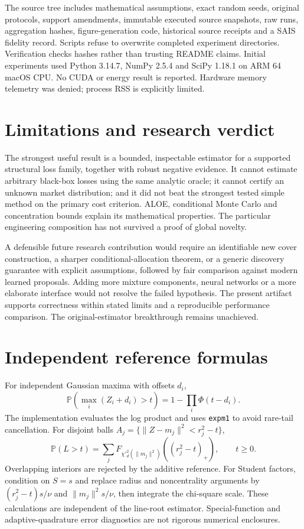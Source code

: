 \documentclass[11pt]{article}
\newcommand{\Pp}{\mathbb P}
\begin{document}
The source tree includes mathematical assumptions, exact random seeds, original protocols, support amendments, immutable executed source snapshots, raw runs, aggregation hashes, figure-generation code, historical source receipts and a SAIS fidelity record. Scripts refuse to overwrite completed experiment directories. Verification checks hashes rather than trusting README claims. Initial experiments used Python 3.14.7, NumPy 2.5.4 and SciPy 1.18.1 on ARM 64 macOS CPU. No CUDA or energy result is reported. Hardware memory telemetry was denied; process RSS is explicitly limited.

\section{Limitations and research verdict}
The strongest useful result is a bounded, inspectable estimator for a supported structural loss family, together with robust negative evidence. It cannot estimate arbitrary black-box losses using the same analytic oracle; it cannot certify an unknown market distribution; and it did not beat the strongest tested simple method on the primary cost criterion. ALOE, conditional Monte Carlo and concentration bounds explain its mathematical properties. The particular engineering composition has not survived a proof of global novelty.

A defensible future research contribution would require an identifiable new cover construction, a sharper conditional-allocation theorem, or a generic discovery guarantee with explicit assumptions, followed by fair comparison against modern learned proposals. Adding more mixture components, neural networks or a more elaborate interface would not resolve the failed hypothesis. The present artifact supports correctness within stated limits and a reproducible performance comparison. The original-estimator breakthrough remains unachieved.

\appendix
\section{Independent reference formulas}
For independent Gaussian maxima with offsets $ d_i $,
\begin{equation}
 \Pp(\max_i(Z_i+d_i)>t)=1-\prod_i\Phi(t-d_i).
\end{equation}
The implementation evaluates the log product and uses \texttt{expm1} to avoid rare-tail cancellation. For disjoint balls $ A_j=\{\|Z-m_j\|^2<r_j^2-t\}$,
\begin{equation}
 \Pp(L>t)=\sum_jF_{\chi'^2_d(\|m_j\|^2)}((r_j^2-t)_+),\qquad t\ge 0.
\end{equation}
Overlapping interiors are rejected by the additive reference. For Student factors, condition on $ S=s $ and replace radius and noncentrality arguments by $(r_j^2-t)s/\nu $ and $\|m_j\|^2s/\nu $, then integrate the chi-square scale. These calculations are independent of the line-root estimator. Special-function and adaptive-quadrature error diagnostics are not rigorous numerical enclosures.
\end{document}
